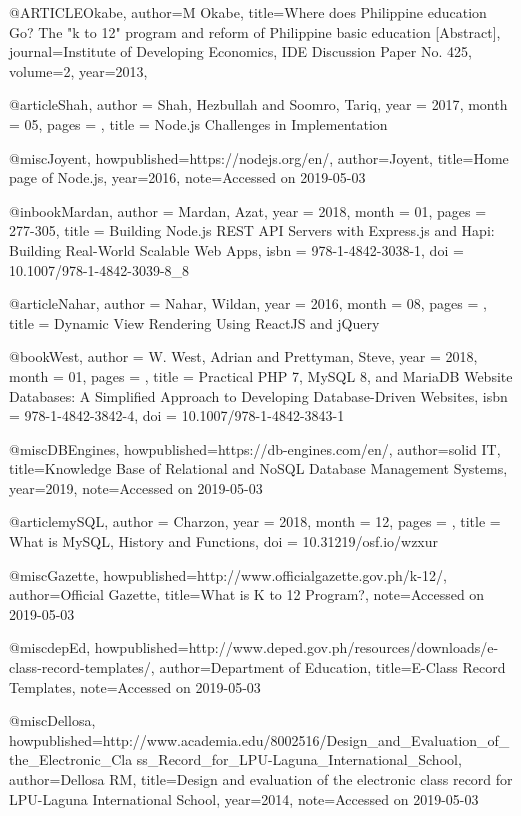 @ARTICLE{Okabe,
    author={M Okabe},
    title={Where does Philippine education Go? The "k to 12" program and reform of Philippine basic education [Abstract]},
    journal={Institute of Developing Economics, IDE Discussion Paper No. 425},
    volume={2},
    year={2013},
}

@article{Shah,
    author = {Shah, Hezbullah and Soomro, Tariq},
    year = {2017},
    month = {05},
    pages = {},
    title = {Node.js Challenges in Implementation}
}

@misc{Joyent,
    howpublished={https://nodejs.org/en/},
    author={Joyent},
    title={Home page of Node.js},
    year={2016},
    note={Accessed on 2019-05-03}
}

@inbook{Mardan,
    author = {Mardan, Azat},
    year = {2018},
    month = {01},
    pages = {277-305},
    title = {Building Node.js REST API Servers with Express.js and Hapi: Building Real-World Scalable Web Apps},
    isbn = {978-1-4842-3038-1},
    doi = {10.1007/978-1-4842-3039-8_8}
}

@article{Nahar,
    author = {Nahar, Wildan},
    year = {2016},
    month = {08},
    pages = {},
    title = {Dynamic View Rendering Using ReactJS and jQuery}
}

@book{West,
    author = {W. West, Adrian and Prettyman, Steve},
    year = {2018},
    month = {01},
    pages = {},
    title = {Practical PHP 7, MySQL 8, and MariaDB Website Databases: A Simplified Approach to Developing Database-Driven Websites},
    isbn = {978-1-4842-3842-4},
    doi = {10.1007/978-1-4842-3843-1}
}

@misc{DBEngines,
    howpublished={https://db-engines.com/en/},
    author={solid IT},
    title={Knowledge Base of Relational and NoSQL Database Management Systems},
    year={2019},
    note={Accessed on 2019-05-03}
}

@article{mySQL,
    author = {Charzon},
    year = {2018},
    month = {12},
    pages = {},
    title = {What is MySQL, History and Functions},
    doi = {10.31219/osf.io/wzxur}
}

@misc{Gazette,
    howpublished={http://www.officialgazette.gov.ph/k-12/},
    author={Official Gazette},
    title={What is K to 12 Program?},
    note={Accessed on 2019-05-03}
}

@misc{depEd,
    howpublished={http://www.deped.gov.ph/resources/downloads/e-class-record-templates/},
    author={Department of Education},
    title={E-Class Record Templates},
    note={Accessed on 2019-05-03}
}

@misc{Dellosa,
    howpublished={http://www.academia.edu/8002516/Design\_and\_Evaluation\_of\_the\_Electronic\_Cla ss\_Record\_for\_LPU-Laguna\_International\_School},
    author={Dellosa RM},
    title={Design and evaluation of the electronic class record for LPU-Laguna International School},
    year={2014},
    note={Accessed on 2019-05-03}
}

